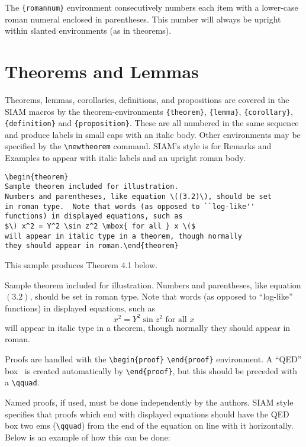 \documentclass[]{article}
\begin{document}
The \texttt{\{romannum\}} environment consecutively numbers each item
with a lower-case roman numeral enclosed in parentheses. This number
will always be upright within slanted environments (as in theorems).

\section{Theorems and Lemmas}\label{theorems-and-lemmas}

Theorems, lemmas, corollaries, definitions, and propositions are covered
in the SIAM macros by the theorem-environments \texttt{\{theorem\}},
\texttt{\{lemma\}}, \texttt{\{corollary\}}, \texttt{\{definition\}} and
\texttt{\{proposition\}}. These are all numbered in the same sequence
and produce labels in small caps with an italic body. Other environments
may be specified by the \texttt{\textbackslash{}newtheorem} command.
SIAM's style is for Remarks and Examples to appear with italic labels
and an upright roman body.

\begin{verbatim}
\begin{theorem}
Sample theorem included for illustration.  
Numbers and parentheses, like equation \((3.2)\), should be set 
in roman type.  Note that words (as opposed to ``log-like''
functions) in displayed equations, such as
$\) x^2 = Y^2 \sin z^2 \mbox{ for all } x \($
will appear in italic type in a theorem, though normally
they should appear in roman.\end{theorem}
\end{verbatim}

This sample produces Theorem 4.1 below.

Sample theorem included for illustration. Numbers and parentheses, like
equation \((3.2)\), should be set in roman type. Note that words (as
opposed to ``log-like'' functions) in displayed equations, such as
\[x^2 = Y^2 \sin z^2 \mbox{ for all } x\] will appear in italic type in
a theorem, though normally they should appear in roman.

Proofs are handled with the \texttt{\textbackslash{}begin\{proof\}}
\texttt{\textbackslash{}end\{proof\}} environment. A ``QED'' box ~is
created automatically by \texttt{\textbackslash{}end\{proof\}}, but this
should be preceded with a \texttt{\textbackslash{}qquad}.

Named proofs, if used, must be done independently by the authors. SIAM
style specifies that proofs which end with displayed equations should
have the QED box two ems (\texttt{\textbackslash{}qquad}) from the end
of the equation on line with it horizontally. Below is an example of how
this can be done:
\end{document}
